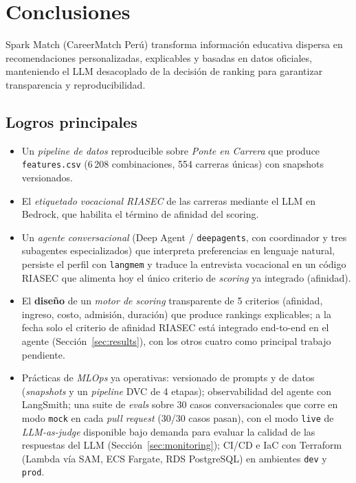 \section{Conclusiones}

Spark Match (CareerMatch Per\'u) transforma informaci\'on educativa dispersa en
recomendaciones personalizadas, explicables y basadas en datos oficiales,
manteniendo el LLM desacoplado de la decisi\'on de ranking para garantizar
transparencia y reproducibilidad.

\subsection{Logros principales}

\begin{itemize}[noitemsep]
  \item Un \emph{pipeline de datos} reproducible sobre \emph{Ponte en Carrera}
        que produce \texttt{features.csv} (6\,208 combinaciones, 554 carreras
        \'unicas) con snapshots versionados.
  \item El \emph{etiquetado vocacional RIASEC} de las carreras mediante el LLM en
        Bedrock, que habilita el t\'ermino de afinidad del scoring.
  \item Un \emph{agente conversacional} (Deep Agent / \texttt{deepagents}, con
        coordinador y tres subagentes especializados) que interpreta
        preferencias en lenguaje natural, persiste el perfil con
        \texttt{langmem} y traduce la entrevista vocacional en un c\'odigo
        RIASEC que alimenta hoy el \'unico criterio de \emph{scoring} ya
        integrado (afinidad).
  \item El \textbf{dise\~no} de un \emph{motor de scoring} transparente de 5
        criterios (afinidad, ingreso, costo, admisi\'on, duraci\'on) que
        produce rankings explicables; a la fecha solo el criterio de
        afinidad RIASEC est\'a integrado end-to-end en el agente
        (Secci\'on~\ref{sec:results}), con los otros cuatro como principal
        trabajo pendiente.
  \item Pr\'acticas de \emph{MLOps} ya operativas: versionado de prompts y de
        datos (\emph{snapshots} y un \emph{pipeline} DVC de 4 etapas);
        observabilidad del agente con LangSmith; una suite de \emph{evals}
        sobre 30 casos conversacionales que corre en modo \texttt{mock} en
        cada \emph{pull request} (30/30 casos pasan), con el modo
        \texttt{live} de \emph{LLM-as-judge} disponible bajo demanda para
        evaluar la calidad de las respuestas del LLM
        (Secci\'on~\ref{sec:monitoring}); CI/CD e IaC con Terraform (Lambda
        vía SAM, ECS Fargate, RDS PostgreSQL) en ambientes \texttt{dev} y
        \texttt{prod}.
\end{itemize}

